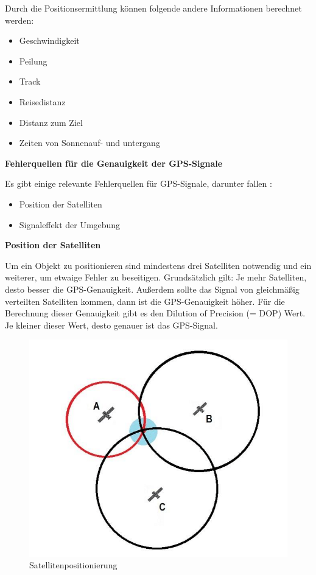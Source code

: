 Durch die Positionsermittlung können folgende andere Informationen berechnet werden:

\begin{itemize}
	\item Geschwindigkeit
	\item Peilung
	\item Track
	\item Reisedistanz
	\item Distanz zum Ziel
	\item Zeiten von Sonnenauf- und untergang
\end{itemize}

\textbf{Fehlerquellen für die Genauigkeit der GPS-Signale}

Es gibt einige relevante Fehlerquellen für GPS-Signale, darunter fallen \parencite{GPSFehlerquellen}:
\begin{itemize}
	\item Position der Satelliten
	\item Signaleffekt der Umgebung
\end{itemize}

\newpage
\textbf{Position der Satelliten}

Um ein Objekt zu positionieren sind mindestens drei Satelliten notwendig und ein weiterer, um etwaige Fehler zu beseitigen. Grundsätzlich gilt: Je mehr Satelliten, desto besser die GPS-Genauigkeit. Außerdem sollte das Signal von gleichmäßig verteilten Satelliten kommen, dann ist die GPS-Genauigkeit höher. Für die Berechnung dieser Genauigkeit gibt es den Dilution of Precision (= DOP) Wert.  Je kleiner dieser Wert, desto genauer ist das GPS-Signal.
\begin{figure}[H]
	\centering
	\includegraphics[width=0.7\linewidth]{images/Satellitenposition.jpg}
	\caption[Satellitenpositionierung]{Satellitenpositionierung}
	\label{fig:Satellitenposition}
\end{figure}

